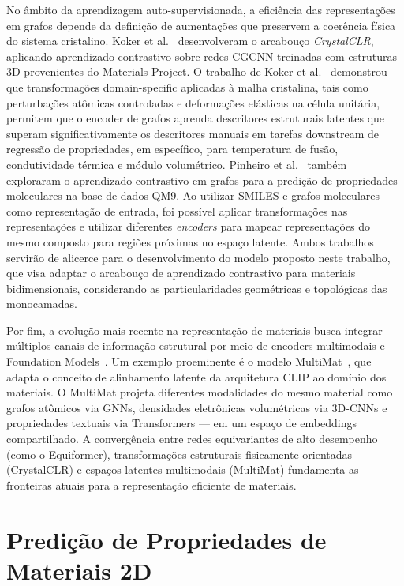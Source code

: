 No âmbito da aprendizagem auto-supervisionada, a eficiência das representações em grafos depende da definição de aumentações que preservem a coerência física do sistema cristalino. Koker et al.~\cite{koker2022graph} desenvolveram o arcabouço \textit{CrystalCLR}, aplicando aprendizado contrastivo sobre redes CGCNN treinadas com estruturas 3D provenientes do Materials Project. O trabalho de Koker et al.~\cite{koker2022graph} demonstrou que transformações domain-specific aplicadas à malha cristalina, tais como perturbações atômicas controladas e deformações elásticas na célula unitária, permitem que o encoder de grafos aprenda descritores estruturais latentes que superam significativamente os descritores manuais em tarefas downstream de regressão de propriedades, em específico, para temperatura de fusão, condutividade térmica e módulo volumétrico.
Pinheiro et al.~\cite{Pinheiro2022} também exploraram o aprendizado contrastivo em grafos para a predição de propriedades moleculares na base de dados QM9. 
Ao utilizar SMILES e grafos moleculares como representação de entrada, foi possível aplicar transformações nas representações e utilizar diferentes \textit{encoders} para mapear representações do mesmo composto para regiões próximas no espaço latente.
Ambos trabalhos servirão de alicerce para o desenvolvimento do modelo proposto neste trabalho, que visa adaptar o arcabouço de aprendizado contrastivo para materiais bidimensionais, considerando as particularidades geométricas e topológicas das monocamadas.



Por fim, a evolução mais recente na representação de materiais busca integrar múltiplos canais de informação estrutural por meio de encoders multimodais e Foundation Models~\cite{van2026survey}. Um exemplo proeminente é o modelo MultiMat~\cite{moro2025multimodal}, que adapta o conceito de alinhamento latente da arquitetura CLIP ao domínio dos materiais. O MultiMat projeta diferentes modalidades do mesmo material como grafos atômicos via GNNs, densidades eletrônicas volumétricas via 3D-CNNs e propriedades textuais via Transformers — em um espaço de embeddings compartilhado. A convergência entre redes equivariantes de alto desempenho (como o Equiformer), transformações estruturais fisicamente orientadas (CrystalCLR) e espaços latentes multimodais (MultiMat) fundamenta as fronteiras atuais para a representação eficiente de materiais.

\section{Predição de Propriedades de Materiais 2D} \label{sec:rb_ppm2d}

